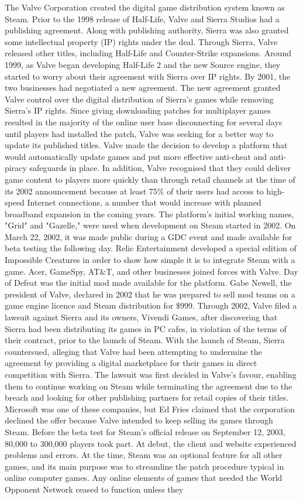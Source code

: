 \documentclass[runningheads]{llncs}
\begin{document}
The Valve Corporation created the digital game distribution system known as Steam. Prior to the 1998 release of Half-Life, Valve and Sierra Studios had a publishing agreement. Along with publishing authority, Sierra was also granted some intellectual property (IP) rights under the deal. Through Sierra, Valve released other titles, including Half-Life and Counter-Strike expansions. Around 1999, as Valve began developing Half-Life 2 and the new Source engine, they started to worry about their agreement with Sierra over IP rights. By 2001, the two businesses had negotiated a new agreement. The new agreement granted Valve control over the digital distribution of Sierra's games while removing Sierra's IP rights. Since giving downloading patches for multiplayer games resulted in the majority of the online user base disconnecting for several days until players had installed the patch, Valve was seeking for a better way to update its published titles. Valve made the decision to develop a platform that would automatically update games and put more effective anti-cheat and anti-piracy safeguards in place. In addition, Valve recognised that they could deliver game content to players more quickly than through retail channels at the time of its 2002 announcement because at least 75\% of their users had access to high-speed Internet connections, a number that would increase with planned broadband expansion in the coming years. The platform's initial working names, "Grid" and "Gazelle," were used when development on Steam started in 2002. On March 22, 2002, it was made public during a GDC event and made available for beta testing the following day. Relic Entertainment developed a special edition of Impossible Creatures in order to show how simple it is to integrate Steam with a game. Acer, GameSpy, AT\&T, and other businesses joined forces with Valve. Day of Defeat was the initial mod made available for the platform. Gabe Newell, the president of Valve, declared in 2002 that he was prepared to sell mod teams on a game engine licence and Steam distribution for \$999. Through 2002, Valve filed a lawsuit against Sierra and its owners, Vivendi Games, after discovering that Sierra had been distributing its games in PC cafes, in violation of the terms of their contract, prior to the launch of Steam. With the launch of Steam, Sierra countersued, alleging that Valve had been attempting to undermine the agreement by providing a digital marketplace for their games in direct competition with Sierra. The lawsuit was first decided in Valve's favour, enabling them to continue working on Steam while terminating the agreement due to the breach and looking for other publishing partners for retail copies of their titles. Microsoft was one of these companies, but Ed Fries claimed that the corporation declined the offer because Valve intended to keep selling its games through Steam. Before the beta test for Steam's official release on September 12, 2003, 80,000 to 300,000 players took part. At debut, the client and website experienced problems and errors. At the time, Steam was an optional feature for all other games, and its main purpose was to streamline the patch procedure typical in online computer games. Any online elements of games that needed the World Opponent Network ceased to function unless they 
\end{document}
